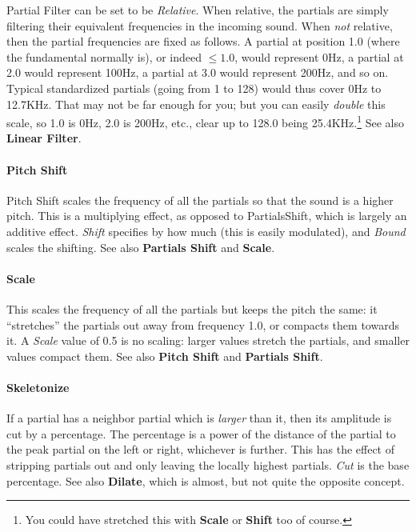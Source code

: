 \documentclass{article}
\begin{document}
Partial Filter can be set to be {\it Relative}.  When relative, the partials are simply filtering their equivalent frequencies in the incoming sound.  When {\it not} relative, then the partial frequencies are fixed as follows.  A partial at position 1.0 (where the fundamental normally is), or indeed \(\leq 1.0\), would represent 0Hz, a partial at 2.0 would represent 100Hz, a partial at 3.0 would represent 200Hz, and so on.  Typical standardized partials (going from 1 to 128) would thus cover 0Hz to 12.7KHz.  That may not be far enough for you; but you can easily {\it double} this scale, so 1.0 is 0Hz, 2.0 is 200Hz, etc., clear up to 128.0 being 25.4KHz.\footnote{You could have stretched this with {\bf Scale} or {\bf Shift} too of course.}  See also {\bf Linear Filter}.

\paragraph{Pitch Shift} Pitch Shift scales the frequency of all the partials so that the sound is a higher pitch.  This is a multiplying effect, as opposed to PartialsShift, which is largely an additive effect.    {\it Shift} specifies by how much (this is easily modulated), and {\it Bound} scales the shifting.  See also {\bf Partials Shift} and  {\bf Scale}.

\paragraph{Scale} This scales the frequency of all the partials but keeps the pitch the same: it ``stretches'' the partials out away from frequency 1.0, or compacts them towards it.  A {\it Scale} value of 0.5 is no scaling: larger values stretch the partials, and smaller values compact them.   See also  {\bf Pitch Shift} and  {\bf Partials Shift}.

\paragraph{Skeletonize} If a partial has a neighbor partial which is {\it larger} than it, then its amplitude is cut by a percentage.  The percentage is a power of the distance of the partial to the peak partial on the left or right, whichever is further.  This has the effect of stripping partials out and only leaving the locally highest partials.  {\it Cut} is the base percentage.  See also {\bf Dilate}, which is almost, but not quite the opposite concept.
\end{document}
